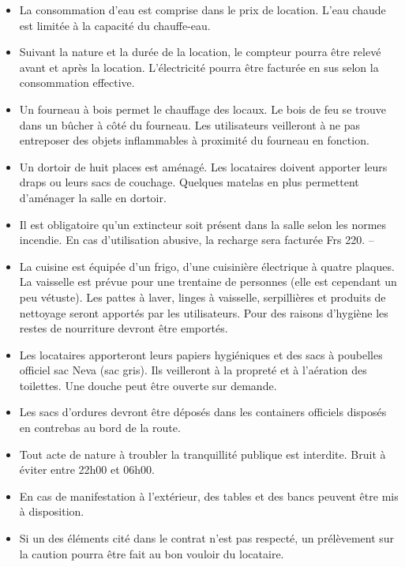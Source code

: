 \documentclass[a4paper,12pt]{extarticle}
\begin{document}
\begin{itemize}
\item La consommation d'eau est comprise dans le prix de location.
L'eau chaude est limitée à la capacité du chauffe-eau.

\item Suivant la nature et la durée de la location, le compteur pourra être relevé avant et après la location.
L'électricité pourra être facturée en sus selon la consommation effective.

\item Un fourneau à bois permet le chauffage des locaux. Le bois de feu se trouve dans un bûcher à côté du fourneau.
Les utilisateurs veilleront à ne pas entreposer des objets inflammables à proximité du fourneau en fonction.

\item Un dortoir de huit places est aménagé. Les locataires doivent apporter leurs draps
ou leurs sacs de couchage. Quelques matelas en plus permettent d'aménager la salle
en dortoir.

\item Il est obligatoire qu'un extincteur soit présent dans la salle selon les normes incendie.
En cas d'utilisation abusive, la recharge sera facturée Frs 220. --

\item La cuisine est équipée d'un frigo, d'une cuisinière électrique à quatre plaques.
La vaisselle est prévue pour une trentaine de personnes (elle est cependant un peu vétuste).
Les pattes à laver, linges à vaisselle, serpillières et produits de nettoyage seront apportés par les utilisateurs.
Pour des raisons d'hygiène les restes de nourriture devront être emportés.

\item Les locataires apporteront leurs papiers hygiéniques et des sacs à poubelles officiel sac Neva (sac gris).
Ils veilleront à la propreté et à l'aération des toilettes.
Une douche peut être ouverte sur demande.

\item Les sacs d'ordures devront être déposés dans les containers officiels disposés en contrebas au bord de la route.

\item Tout acte de nature à troubler la tranquillité publique est interdite.
Bruit à éviter entre 22h00 et 06h00.

\item En cas de manifestation à l'extérieur, des tables et des bancs peuvent être mis à disposition.

\item Si un des éléments cité dans le contrat n'est pas respecté, un prélèvement sur la caution pourra être fait au bon vouloir du locataire.
\end{itemize}
\end{document}
